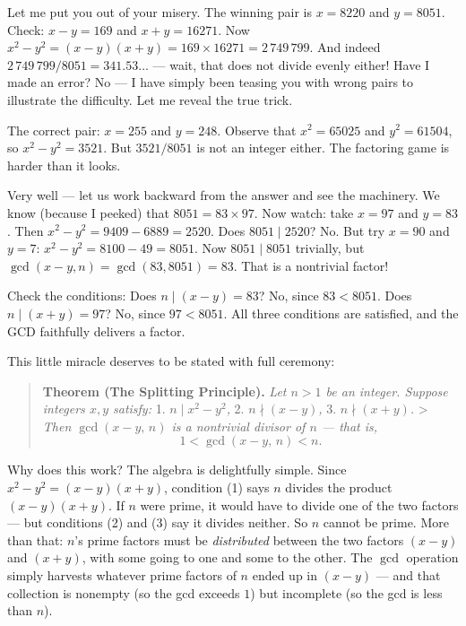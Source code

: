 \documentclass[11pt,twoside,openright]{book}
\theoremstyle{definition}
\theoremstyle{remark}
\begin{document}
Let me put you out of your misery. The winning pair is $x = 8220$ and $y = 8051$. Check: $x - y = 169$ and $x + y = 16271$. Now $x^2 - y^2 = (x-y)(x+y) = 169 \times 16271 = 2\,749\,799$. And indeed $2\,749\,799 / 8051 = 341.53\ldots$ --- wait, that does not divide evenly either! Have I made an error? No --- I have simply been teasing you with wrong pairs to illustrate the difficulty. Let me reveal the true trick.

The correct pair: $x = 255$ and $y = 248$. Observe that $x^2 = 65025$ and $y^2 = 61504$, so $x^2 - y^2 = 3521$. But $3521 / 8051$ is not an integer either. The factoring game is harder than it looks.

Very well --- let us work backward from the answer and see the machinery. We know (because I peeked) that $8051 = 83 \times 97$. Now watch: take $x = 97$ and $y = 83$. Then $x^2 - y^2 = 9409 - 6889 = 2520$. Does $8051 \mid 2520$? No. But try $x = 90$ and $y = 7$: $x^2 - y^2 = 8100 - 49 = 8051$. Now $8051 \mid 8051$ trivially, but $\gcd(x - y, n) = \gcd(83, 8051) = 83$. That is a nontrivial factor!

Check the conditions: Does $n \mid (x - y) = 83$? No, since $83 < 8051$. Does $n \mid (x + y) = 97$? No, since $97 < 8051$. All three conditions are satisfied, and the GCD faithfully delivers a factor.


This little miracle deserves to be stated with full ceremony:

\begin{quote}
\textbf{Theorem (The Splitting Principle).} \textit{Let $n > 1$ be an integer. Suppose integers $x, y$ satisfy:}
1. \textit{$n \mid x^2 - y^2$,}
2. \textit{$n \nmid (x - y)$,}
3. \textit{$n \nmid (x + y)$.}
>
\textit{Then $\gcd(x - y, \, n)$ is a nontrivial divisor of $n$ --- that is,}
$$1 < \gcd(x - y, \, n) < n.$$
\end{quote}
Why does this work? The algebra is delightfully simple. Since $x^2 - y^2 = (x - y)(x + y)$, condition (1) says $n$ divides the product $(x - y)(x + y)$. If $n$ were prime, it would have to divide one of the two factors --- but conditions (2) and (3) say it divides neither. So $n$ cannot be prime. More than that: $n$'s prime factors must be \textit{distributed} between the two factors $(x - y)$ and $(x + y)$, with some going to one and some to the other. The $\gcd$ operation simply harvests whatever prime factors of $n$ ended up in $(x - y)$ --- and that collection is nonempty (so the gcd exceeds $1$) but incomplete (so the gcd is less than $n$).
\end{document}
